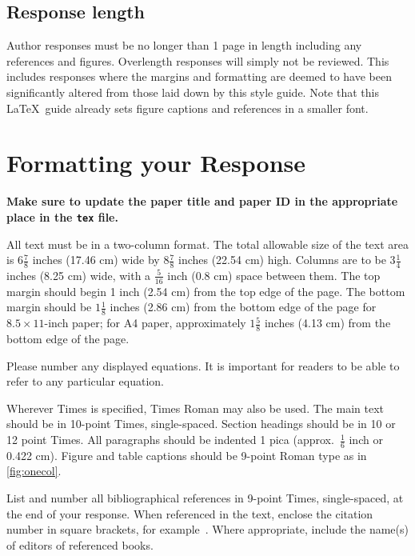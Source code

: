 \documentclass[10pt,twocolumn,letterpaper]{article}
\begin{document}
\subsection{Response length}
Author responses must be no longer than 1 page in length including any references and figures.
Overlength responses will simply not be reviewed.
This includes responses where the margins and formatting are deemed to have been significantly altered from those laid down by this style guide.
Note that this \LaTeX\ guide already sets figure captions and references in a smaller font.


\section{Formatting your Response}

{\bf Make sure to update the paper title and paper ID in the appropriate place in the \verb+tex+ file.}

All text must be in a two-column format.
The total allowable size of the text area is $6\frac78$ inches (17.46 cm) wide by $8\frac78$ inches (22.54 cm) high.
Columns are to be $3\frac14$ inches (8.25 cm) wide, with a $\frac{5}{16}$ inch (0.8 cm) space between them.
The top margin should begin 1 inch (2.54 cm) from the top edge of the page.
The bottom margin should be $1\frac{1}{8}$ inches (2.86 cm) from the bottom edge of the page for $8.5 \times 11$-inch paper;
for A4 paper, approximately $1\frac{5}{8}$ inches (4.13 cm) from the bottom edge of the page.

Please number any displayed equations.
It is important for readers to be able to refer to any particular equation.

Wherever Times is specified, Times Roman may also be used.
The main text should be in 10-point Times, single-spaced.
Section headings should be in 10 or 12 point Times.
All paragraphs should be indented 1 pica (approx.\ $\frac{1}{6}$ inch or 0.422 cm).
Figure and table captions should be 9-point Roman type as in \cref{fig:onecol}.


List and number all bibliographical references in 9-point Times, single-spaced,
at the end of your response.
When referenced in the text, enclose the citation number in square brackets, for example~\cite{Alpher05}.
Where appropriate, include the name(s) of editors of referenced books.
\end{document}
